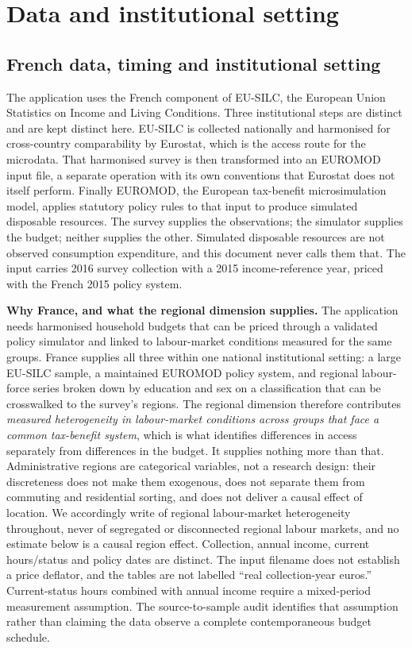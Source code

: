 \documentclass[11pt,a4paper]{article}
\begin{document}
\section{Data and institutional setting}\label{data-and-institutional-setting}

\subsection{French data, timing and institutional setting}\label{french-data-timing-and-institutional-setting}

The application uses the French component of EU-SILC, the European Union Statistics on Income and Living Conditions. Three institutional steps are distinct and are kept distinct here. EU-SILC is collected nationally and harmonised for cross-country comparability by Eurostat, which is the access route for the microdata. That harmonised survey is then transformed into an EUROMOD input file, a separate operation with its own conventions that Eurostat does not itself perform. Finally EUROMOD, the European tax-benefit microsimulation model, applies statutory policy rules to that input to produce simulated disposable resources. The survey supplies the observations; the simulator supplies the budget; neither supplies the other. Simulated disposable resources are not observed consumption expenditure, and this document never calls them that. The input carries 2016 survey collection with a 2015 income-reference year, priced with the French 2015 policy system.

\textbf{Why France, and what the regional dimension supplies.} The application needs harmonised household budgets that can be priced through a validated policy simulator and linked to labour-market conditions measured for the same groups. France supplies all three within one national institutional setting: a large EU-SILC sample, a maintained EUROMOD policy system, and regional labour-force series broken down by education and sex on a classification that can be crosswalked to the survey's regions. The regional dimension therefore contributes \emph{measured heterogeneity in labour-market conditions across groups that face a common tax-benefit system}, which is what identifies differences in access separately from differences in the budget. It supplies nothing more than that. Administrative regions are categorical variables, not a research design: their discreteness does not make them exogenous, does not separate them from commuting and residential sorting, and does not deliver a causal effect of location. We accordingly write of regional labour-market heterogeneity throughout, never of segregated or disconnected regional labour markets, and no estimate below is a causal region effect. Collection, annual income, current hours/status and policy dates are distinct. The input filename does not establish a price deflator, and the tables are not labelled ``real collection-year euros.'' Current-status hours combined with annual income require a mixed-period measurement assumption. The source-to-sample audit identifies that assumption rather than claiming the data observe a complete contemporaneous budget schedule.
\end{document}
